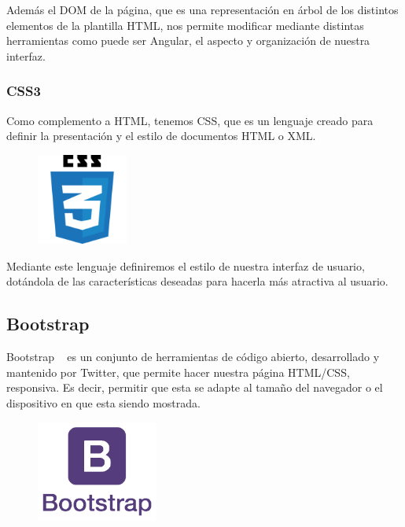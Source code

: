 \documentclass[a4paper, spanish, 12pt]{book}
\begin{document}
Adem\'as el DOM de la p\'agina, que es una representaci\'on en \'arbol de los distintos
elementos de la plantilla HTML, nos permite modificar mediante distintas herramientas
como puede ser Angular, el aspecto y organizaci\'on de nuestra interfaz.

\subsubsection*{CSS3}
\label{subsec:css3}

Como complemento a HTML, tenemos CSS, que es un lenguaje creado para definir la presentaci\'on
y el estilo de documentos HTML o XML.

\begin{figure}[H]
  \centering
  \includegraphics[width=3cm, keepaspectratio]{img/css3-logo}
\end{figure}

Mediante este lenguaje definiremos el estilo de nuestra interfaz de usuario, dot\'andola
de las caracter\'isticas deseadas para hacerla m\'as atractiva al usuario.

\subsection{Bootstrap}
\label{subsec:bootstrap}

Bootstrap ~\cite{bootstrap} es un conjunto de herramientas de c\'odigo abierto, desarrollado y mantenido
por Twitter, que permite hacer nuestra p\'agina HTML/CSS, responsiva. Es decir,
permitir que esta se adapte al tama\~no del navegador o el dispositivo en que
esta siendo mostrada.

\begin{figure}[H]
  \centering
  \includegraphics[width=4cm, keepaspectratio]{img/bootstrap-logo}
\end{figure}
\end{document}
